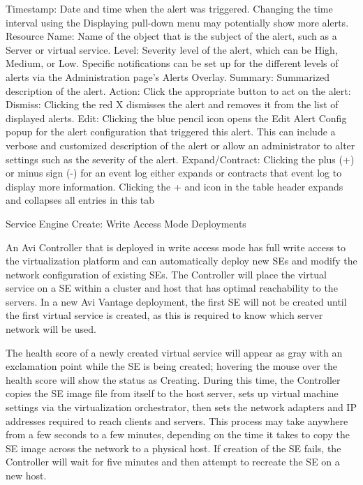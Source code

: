 \documentclass[letterpaper,10pt,english]{sphinxmanual}
\begin{document}
Timestamp: Date and time when the alert was triggered. Changing the time interval using the Displaying pull-down menu may potentially show more alerts.
Resource Name: Name of the object that is the subject of the alert, such as a Server or virtual service.
Level: Severity level of the alert, which can be High, Medium, or Low. Specific notifications can be set up for the different levels of alerts via the Administration page's Alerts Overlay.
Summary: Summarized description of the alert.
Action: Click the appropriate button to act on the alert:
Dismiss: Clicking the red X dismisses the alert and removes it from the list of displayed alerts.
Edit: Clicking the blue pencil icon opens the Edit Alert Config popup for the alert configuration that triggered this alert. This can include a verbose and customized description of the alert or allow an administrator to alter settings such as the severity of the alert.
Expand/Contract: Clicking the plus (+) or minus sign (-) for an event log either expands or contracts that event log to display more information. Clicking the + and \textendash{} icon in the table header expands and collapses all entries in this tab

Service Engine Create: Write Access Mode Deployments

An Avi Controller that is deployed in write access mode has full write access to the virtualization platform and can automatically deploy new SEs and modify the network configuration of existing SEs. The Controller will place the virtual service on a SE within a cluster and host that has optimal reachability to the servers. In a new Avi Vantage deployment, the first SE will not be created until the first virtual service is created, as this is required to know which server network will be used.

The health score of a newly created virtual service will appear as gray with an exclamation point while the SE is being created; hovering the mouse over the health score will show the status as Creating. During this time, the Controller copies the SE image file from itself to the host server, sets up virtual machine settings via the virtualization orchestrator, then sets the network adapters and IP addresses required to reach clients and servers. This process may take anywhere from a few seconds to a few minutes, depending on the time it takes to copy the SE image across the network to a physical host. If creation of the SE fails, the Controller will wait for five minutes and then attempt to recreate the SE on a new host.
\end{document}

